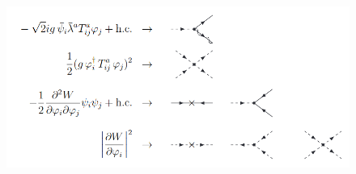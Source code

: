 \documentclass[12pt]{article}
\begin{document}
\begin{figure}[h]
  \centering 
  \includegraphics[scale=0.35]{sqcd_inter_1.png}
\end{figure}
\end{document}
